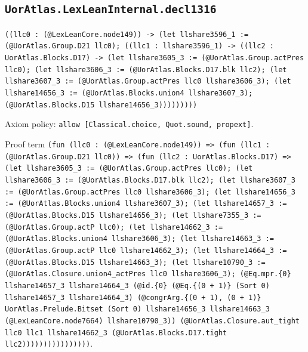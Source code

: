 \documentclass[11pt]{article}
\begin{document}
\subsection*{\texttt{UorAtlas.LexLeanInternal.decl1316}}
\noindent\texttt{((llc0 : (@LexLeanCore.node149)) -> (let llshare3596\_1 := (@UorAtlas.Group.D21 llc0); ((llc1 : llshare3596\_1) -> ((llc2 : UorAtlas.Blocks.D17) -> (let llshare3605\_3 := (@UorAtlas.Group.actPres llc0); (let llshare3606\_3 := (@UorAtlas.Blocks.D17.blk llc2); (let llshare3607\_3 := (@UorAtlas.Group.actPres llc0 llshare3606\_3); (let llshare14656\_3 := (@UorAtlas.Blocks.union4 llshare3607\_3); (@UorAtlas.Blocks.D15 llshare14656\_3)))))))))}\par
\noindent Axiom policy: \texttt{allow [Classical.choice, Quot.sound, propext]}.\par
\noindent Proof term \texttt{(fun (llc0 : (@LexLeanCore.node149)) => (fun (llc1 : (@UorAtlas.Group.D21 llc0)) => (fun (llc2 : UorAtlas.Blocks.D17) => (let llshare3605\_3 := (@UorAtlas.Group.actPres llc0); (let llshare3606\_3 := (@UorAtlas.Blocks.D17.blk llc2); (let llshare3607\_3 := (@UorAtlas.Group.actPres llc0 llshare3606\_3); (let llshare14656\_3 := (@UorAtlas.Blocks.union4 llshare3607\_3); (let llshare14657\_3 := (@UorAtlas.Blocks.D15 llshare14656\_3); (let llshare7355\_3 := (@UorAtlas.Group.actP llc0); (let llshare14662\_3 := (@UorAtlas.Blocks.union4 llshare3606\_3); (let llshare14663\_3 := (@UorAtlas.Group.actP llc0 llshare14662\_3); (let llshare14664\_3 := (@UorAtlas.Blocks.D15 llshare14663\_3); (let llshare10790\_3 := (@UorAtlas.Closure.union4\_actPres llc0 llshare3606\_3); (@Eq.mpr.\{0\} llshare14657\_3 llshare14664\_3 (@id.\{0\} (@Eq.\{(0 + 1)\} (Sort 0) llshare14657\_3 llshare14664\_3) (@congrArg.\{(0 + 1), (0 + 1)\} UorAtlas.Prelude.Bitset (Sort 0) llshare14656\_3 llshare14663\_3 (@LexLeanCore.node7664) llshare10790\_3)) (@UorAtlas.Closure.aut\_tight llc0 llc1 llshare14662\_3 (@UorAtlas.Blocks.D17.tight llc2))))))))))))))))}.\par
\end{document}
